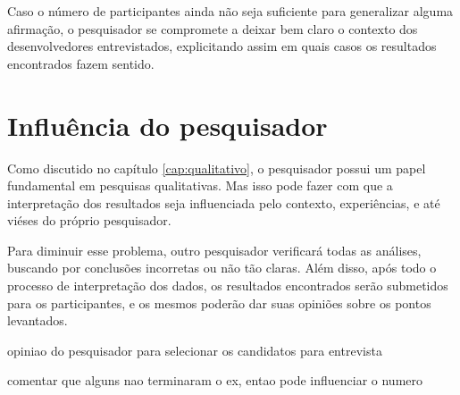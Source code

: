 Caso o número de participantes ainda não seja suficiente para generalizar alguma afirmação, 
o pesquisador se compromete a deixar bem claro o contexto dos desenvolvedores entrevistados,
explicitando assim em quais casos os resultados encontrados fazem sentido.

\section{Influência do pesquisador}

Como discutido no capítulo \ref{cap:qualitativo}, o pesquisador possui
um papel fundamental em pesquisas qualitativas. Mas isso pode fazer com que
a interpretação dos resultados seja influenciada pelo contexto, experiências,
e até viéses do próprio pesquisador.

Para diminuir esse problema, outro pesquisador verificará todas as análises,
buscando por conclusões incorretas ou não tão claras. Além disso, após todo o
processo de interpretação dos dados, os resultados encontrados serão submetidos
para os participantes, e os mesmos poderão dar suas opiniões sobre os pontos
levantados.




opiniao do pesquisador para selecionar os candidatos para entrevista


comentar que alguns nao terminaram o ex, entao pode influenciar o numero